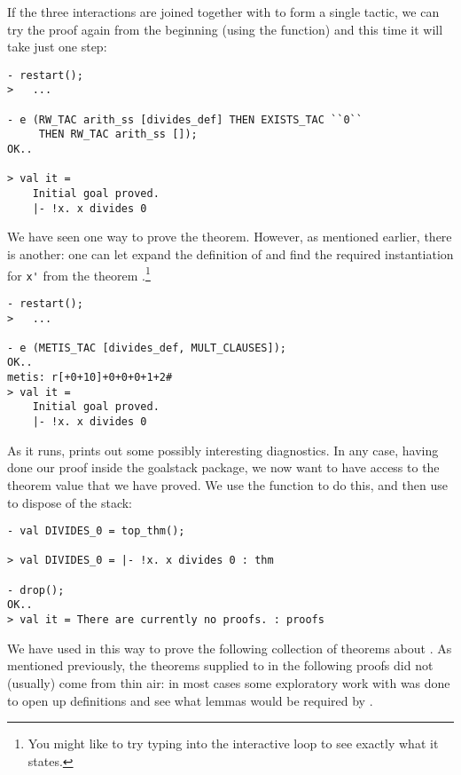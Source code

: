 If the three interactions are joined together with  to
form a single tactic, we can try the proof again from the
beginning (using the  function) and this time it will
take just one step:
\begin{session}
\begin{verbatim}
- restart();
>   ...

- e (RW_TAC arith_ss [divides_def] THEN EXISTS_TAC ``0`` 
     THEN RW_TAC arith_ss []);
OK..

> val it =
    Initial goal proved.
    |- !x. x divides 0
\end{verbatim}
\end{session}
We have seen one way to prove the theorem. However, as mentioned
earlier, there is another: one can let  expand the
definition of  and find the required instantiation for
\verb+x'+ from the theorem .\footnote{You might
  like to try typing  into the interactive loop
  to see exactly what it states.}
\begin{session}
\begin{verbatim}
- restart();
>   ...

- e (METIS_TAC [divides_def, MULT_CLAUSES]);
OK..
metis: r[+0+10]+0+0+0+1+2#
> val it =
    Initial goal proved.
    |- !x. x divides 0
\end{verbatim}
\end{session}
As it runs,  prints out some possibly interesting
diagnostics. In any case, having done our proof inside the goalstack package,
    we now want to have access to the theorem value that we have
    proved.  We use the  function to do this, and then
    use  to dispose of the stack:
\begin{session}
\begin{verbatim}
- val DIVIDES_0 = top_thm();

> val DIVIDES_0 = |- !x. x divides 0 : thm

- drop();
OK..
> val it = There are currently no proofs. : proofs
\end{verbatim}
\end{session}

We have used  in this way to prove the following
collection of theorems about . As mentioned previously, the
theorems supplied to  in the following proofs did not
(usually) come from thin air: in most cases some exploratory work with
 was done to open up definitions and see what lemmas would
be required by .

